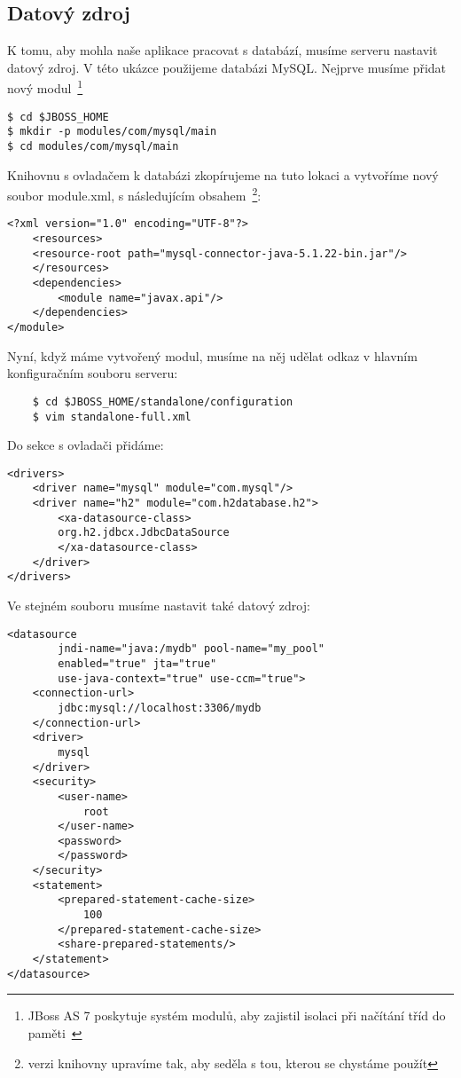 \documentclass[122pt,oneside]{fithesis}
\begin{document}
\subsection{Datový zdroj}
K tomu, aby mohla naše aplikace pracovat s databází, musíme serveru nastavit datový zdroj. V této ukázce použijeme databázi MySQL.
Nejprve musíme přidat nový modul~\footnote{JBoss AS 7 poskytuje systém modulů, aby zajistil isolaci při načítání tříd do paměti~\cite{datasource}}
\begin{lstlisting}
$ cd $JBOSS_HOME
$ mkdir -p modules/com/mysql/main
$ cd modules/com/mysql/main
\end{lstlisting}
Knihovnu s ovladačem k databázi zkopírujeme na tuto lokaci a vytvoříme nový soubor module.xml, s následujícím obsahem~\footnote{verzi knihovny upravíme tak, aby seděla s tou, kterou se chystáme použít}:
\begin{lstlisting}
<?xml version="1.0" encoding="UTF-8"?>
	<resources>
	<resource-root path="mysql-connector-java-5.1.22-bin.jar"/>
	</resources>
	<dependencies>
		<module name="javax.api"/>
	</dependencies>
</module>
\end{lstlisting}
Nyní, když máme vytvořený modul, musíme na něj udělat odkaz v hlavním konfiguračním souboru serveru:
\begin{lstlisting}
	$ cd $JBOSS_HOME/standalone/configuration
	$ vim standalone-full.xml
\end{lstlisting}
Do sekce s ovladači přidáme:
\begin{lstlisting}
<drivers>
	<driver name="mysql" module="com.mysql"/>
	<driver name="h2" module="com.h2database.h2">
        <xa-datasource-class>
		org.h2.jdbcx.JdbcDataSource
        </xa-datasource-class>
	</driver>
</drivers>
\end{lstlisting}
Ve stejném souboru musíme nastavit také datový zdroj:
\begin{lstlisting}
<datasource
        jndi-name="java:/mydb" pool-name="my_pool"
        enabled="true" jta="true"
        use-java-context="true" use-ccm="true">
    <connection-url>
        jdbc:mysql://localhost:3306/mydb
    </connection-url>
    <driver>
        mysql
    </driver>
    <security>
        <user-name>
            root
        </user-name>
        <password>
        </password>
    </security>
    <statement>
        <prepared-statement-cache-size>
            100
        </prepared-statement-cache-size>
        <share-prepared-statements/>
    </statement>
</datasource>
\end{lstlisting}
\end{document}
